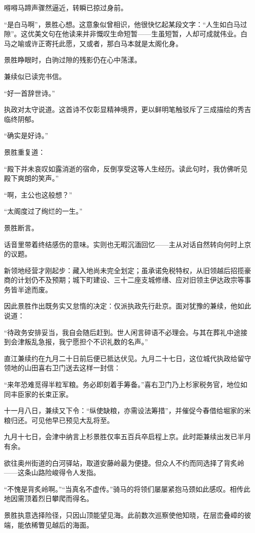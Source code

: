 \documentclass[
]{book}
\begin{document}
嘚嘚马蹄声骤然逼近，转瞬已掠过身前。

``是白马啊''，景胜心想。这意象似曾相识，他很快忆起某段文字：``人生如白马过隙''。这优美文句在他读来并非慨叹生命短暂------生虽短暂，人却可成就伟业。白马之喻或许正寄托此愿，又或者，那白马本就是太阁化身。

景胜睁眼时，白驹过隙的残影仍在心中荡漾。

兼续似已读完书信。

``好一首辞世诗。''

执政对太守说道。这首诗不仅彰显精神境界，更以鲜明笔触驳斥了三成描绘的秀吉临终阴郁。

``确实是好诗。''

景胜重复道：

``殿下并未哀叹如露消逝的宿命，反倒享受这等人生经历。读此句时，我仿佛听见殿下爽朗的笑声。''

``啊，主公也这般想？''

``太阁度过了绚烂的一生。''

景胜断言。

话音里带着终结感伤的意味。实则也无暇沉湎回忆------主从对话自然转向何时上京的议题。

新领地经营才刚起步：藏入地尚未完全划定；虽承诺免税特权，从旧领越后招揽豪商的计划仍不及预期；城下町建设、三十二座支城修缮、应对旧领主伊达政宗等事务皆半途而废。

因此景胜作出既务实又怠惰的决定：仅派执政先行赴京。面对犹豫的兼续，他如此说道：

``待政务安排妥当，我自会随后赶到。世人闲言碎语不必理会。与其在葬礼中途接到会津叛乱急报，我宁愿担个不识礼数的名声。''

直江兼续约在九月二十日前后便已抵达伏见。九月二十七日，这位城代执政给留守领地的山田喜右卫门送去这样一封信：

``来年恐难觅得半粒军粮。务必即刻着手筹备。''喜右卫门乃上杉家税务官，地位如同丰臣家的长束正家。

十一月八日，兼续又下令：``纵使缺粮，亦需设法筹措''，并催促今春借给堀家的米粮归还。可见他早已预见大乱将至。

九月十七日，会津中纳言上杉景胜仅率五百兵卒启程上京。此时距兼续出发已半月有余。

欲往奥州街道的白河驿站，取道安藤岭最为便捷。但众人不约而同选择了背炙岭------这条山路险峻得令人发指。

``不愧是背炙岭啊。''``当真名不虚传。''骑马的将领们屡屡紧抱马颈如此感叹。相传此地因需顶着烈日攀爬而得名。

景胜执意选择险径，只因山顶能望见海。此前数次巡察使他知晓，在层峦叠嶂的彼端，能依稀瞥见越后的海面。
\end{document}
